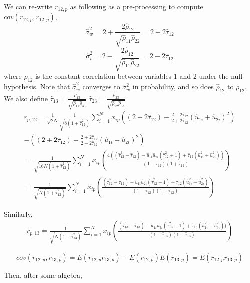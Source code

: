 \documentclass[aap,authoryear, preprint]{imsart}
\numberwithin{equation}{section}
\theoremstyle{plain}
\begin{document}
\noindent We can re-write $r_{12,p}$ as following as a pre-processing to compute $cov(r_{12,p}, r_{12,p})$,
$$\hat{\sigma}_w^2 = 2 + \frac{2\hat{\rho}_{12}}{\sqrt{\hat{\rho}_{11}\hat{\rho}_{22}}} = 2+2\hat{\tau}_{12}$$
$$\hat{\sigma}_v^2 = 2 - \frac{2\hat{\rho}_{12}}{\sqrt{\hat{\rho}_{11}\hat{\rho}_{22}}} = 2-2\hat{\tau}_{12}$$
where $\rho_{12}$ is the constant correlation between variables 1 and 2 under the null hypothesis. Note that $\hat{\sigma}_w^2$ converges to $\sigma_w^2$ in probability, and so does $\hat{\rho}_{12}$ to $\rho_{12}$. We also define
$\hat{\tau}_{13} = \frac{\hat{\rho}_{13}}{\sqrt{\hat{\rho}_{11}\hat{\rho}_{33}}}$
$\hat{\tau}_{23} = \frac{\hat{\rho}_{23}}{\sqrt{\hat{\rho}_{22}\hat{\rho}_{33}}}$
\begin{equation}
\begin{multlined}
    r_{p,12} = \frac{1}{\sqrt{2N}} \frac{1}{\sqrt{8(1 + \hat{\tau}_{12}^2)}}
    \sum_{i=1}^{N} x_{ip}\left( (2-2\hat{\tau}_{12})- \frac{2-2\hat{\tau}_{12}}{2+2\hat{\tau}_{12}}(\hat{u}_{1i}+\hat{u}_{2i})^2\right)\\  - \left( (2+2\hat{\tau}_{12}) - \frac{2+2\hat{\tau}_{12}}{2-2\hat{\tau}_{12}}(\hat{u}_{1i}-\hat{u}_{2i})^2\right)\\
    = \frac{1}{\sqrt{16N(1+\hat{\tau}_{12}^2)}} \sum_{i=1}^{N}x_{ip}
    \left( 
    \frac{4((\hat{\tau}_{12}^3 - \hat{\tau}_{12}) - \hat{u}_{1i}\hat{u}_{2i}(\hat{\tau}_{12}^2 + 1) + \hat{\tau}_{12}(\hat{u}_{1i}^2 + \hat{u}_{2i}^2))}{(1-\hat{\tau}_{12})(1+\hat{\tau}_{12})}
    \right)\\
    = \frac{1}{\sqrt{N(1+\hat{\tau}_{12}^2)}}\sum_{i=1}^{N}x_{ip} \left( 
    \frac{(\hat{\tau}_{12}^3 - \hat{\tau}_{12}) - \hat{u}_{1i}\hat{u}_{2i}(\hat{\tau}_{12}^2 + 1) + \hat{\tau}_{12}(\hat{u}_{1i}^2 + \hat{u}_{2i}^2)}{(1-\hat{\tau}_{12})(1+\hat{\tau}_{12})}
    \right)
\end{multlined}
\end{equation}

 Similarly,
\begin{align*}
    r_{p,13} = 
    \frac{1}{\sqrt{N(1+\hat{\tau}_{13}^2)}}\sum_{i=1}^{N}x_{ip} \left( 
    \frac{(\hat{\tau}_{13}^3 - \hat{\tau}_{13}) - \hat{u}_{1i}\hat{u}_{3i}(\hat{\tau}_{13}^2 + 1) + \hat{\tau}_{13}(\hat{u}_{1i}^2 + \hat{u}_{3i}^2))}{(1-\hat{\tau}_{13})(1+\hat{\tau}_{13})}
    \right)
\end{align*}

$$cov(r_{12,p}, r_{13,p}) = E(r_{12,p}r_{13,p}) - E(r_{12,p})E(r_{13,p}) = E(r_{12,p}r_{13,p})$$

 Then, after some algebra,
\end{document}
